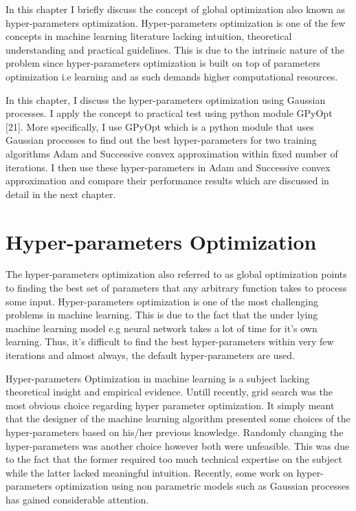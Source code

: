 In this chapter I briefly discuss the concept of global optimization also known as hyper-parameters optimization. Hyper-parameters optimization is one of the few concepts in machine learning literature lacking intuition, theoretical understanding and practical guidelines. This is due to the intrinsic nature of the problem since hyper-parameters optimization is built on top of parameters optimization i.e learning and as such demands higher computational resources. 

In this chapter, I discuss the hyper-parameters optimization using Gaussian processes. I apply the concept to practical test using python module GPyOpt [21]. More specifically, I use GPyOpt which is a python module that uses Gaussian processes to find out the best hyper-parameters for two training algorithms Adam and Successive convex approximation within fixed number of iterations. I then use these hyper-parameters in Adam and Successive convex approximation and compare their performance results which are discussed in detail in the next chapter. 

\section {Hyper-parameters Optimization}

The hyper-parameters optimization also referred to as global optimization points to finding the best set of parameters that any arbitrary function takes to process some input. Hyper-parameters optimization is one of the most challenging problems in machine learning. This is due to the fact that the under lying machine learning model e.g neural network takes a lot of time for it's own learning. Thus, it's difficult to find the best hyper-parameters within very few iterations and almost always, the default hyper-parameters are used.

Hyper-parameters Optimization in machine learning is a subject lacking theoretical insight and empirical evidence. Untill recently, grid search was the most obvious choice regarding hyper parameter optimization.  It simply meant that the designer of the machine learning algorithm presented some choices of the hyper-parameters based on his/her previous knowledge. Randomly changing the hyper-parameters was another choice however both were unfeasible. This was due to the fact that the former required too much technical expertise on the subject while the latter lacked meaningful intuition. Recently, some work on hyper-parameters optimization using non parametric models such as Gaussian processes has gained considerable attention.

